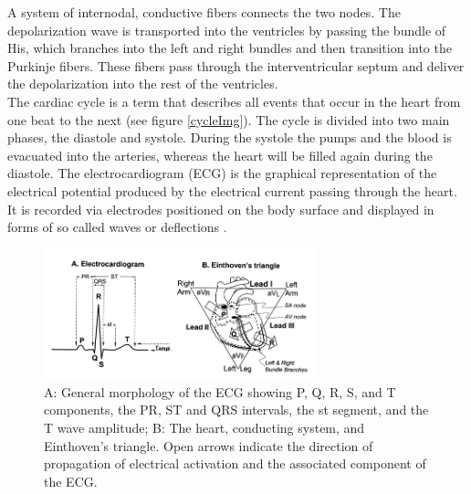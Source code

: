 A system of internodal, conductive fibers connects the two nodes. The depolarization wave is transported into the ventricles by passing the bundle of His, which branches into the left and right bundles and then transition into the Purkinje fibers. These fibers pass through the interventricular septum and deliver the depolarization into the rest of the ventricles.\\
The cardiac cycle is a term that describes all events that occur in the heart from one beat to the next (see figure \ref{cycleImg}). The cycle is divided into two main phases, the diastole and systole. During the systole the pumps and the blood is evacuated into the arteries, whereas the heart will be filled again during the diastole. The electrocardiogram (ECG) is the graphical representation of the electrical potential produced by the electrical current passing through the heart. It is recorded via electrodes positioned on the body surface and displayed in forms of so called waves or deflections \cite{ABDULLA2014}.

\begin{figure}[ht]
\centering
\includegraphics[width=0.7\textwidth]{images/ecg.png}
\caption{A: General morphology of the ECG showing P, Q, R, S, and T components, the PR, ST and QRS intervals, the st segment, and the T wave amplitude; B: The heart, conducting system, and Einthoven's triangle. Open arrows indicate the direction of propagation of electrical activation and the associated component of the ECG.}
\label{ecgImg}
\end{figure}

